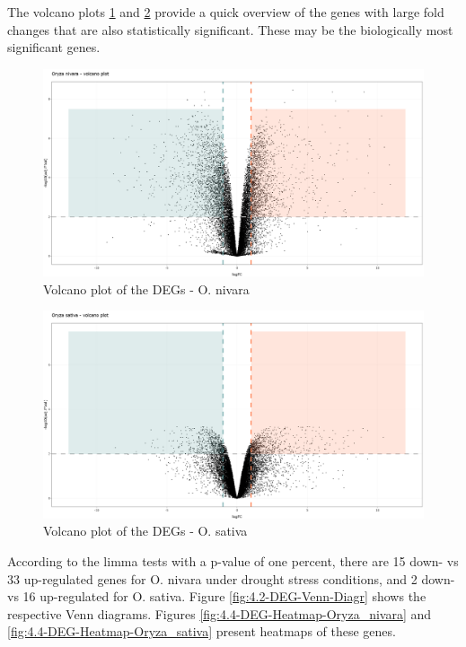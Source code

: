 The volcano plots \ref{fig:4.1-DEG-Volcano-Plot-Oryza_nivara} and \ref{fig:4.1-DEG-Volcano-Plot-Oryza_sativa} provide a quick overview of the genes with large fold changes that are also statistically significant. These may be the biologically most significant genes.

\begin{figure}[htbp]
    \caption{Volcano plot of the DEGs - O. nivara}
    \label{fig:4.1-DEG-Volcano-Plot-Oryza_nivara}
    \includegraphics[width=\textwidth]{../../results/plots-and-tables/4.1-DEG-Volcano-Plot-Oryza_nivara}
\end{figure}

\begin{figure}[htbp]
    \caption{Volcano plot of the DEGs - O. sativa}
    \label{fig:4.1-DEG-Volcano-Plot-Oryza_sativa}
    \includegraphics[width=\textwidth]{../../results/plots-and-tables/4.1-DEG-Volcano-Plot-Oryza_sativa}
\end{figure}

According to the limma tests with a p-value of one percent, there are 15 down- vs 33 up-regulated genes for O. nivara under drought stress conditions, and 2 down- vs 16 up-regulated for O. sativa. Figure \ref{fig:4.2-DEG-Venn-Diagr} shows the respective Venn diagrams. Figures \ref{fig:4.4-DEG-Heatmap-Oryza_nivara} and \ref{fig:4.4-DEG-Heatmap-Oryza_sativa} present heatmaps of these genes.

